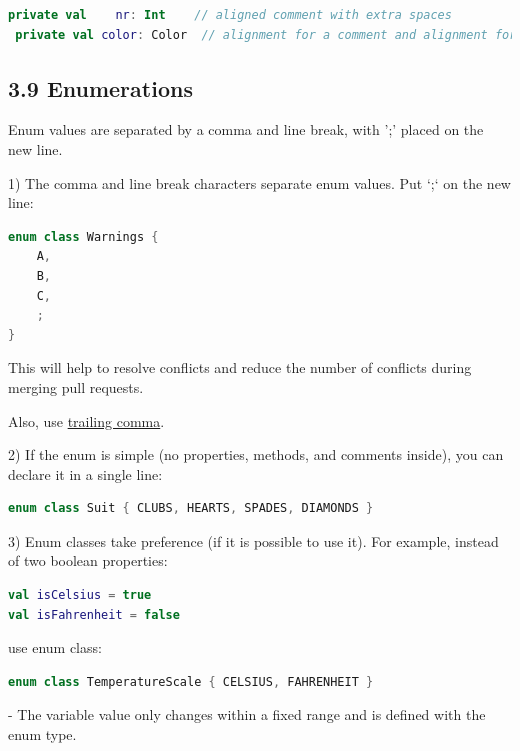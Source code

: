 {{{{\begin{lstlisting}[language=Kotlin]
 private val    nr: Int    // aligned comment with extra spaces
 private val color: Color  // alignment for a comment and alignment for identifier name
\end{lstlisting}


\subsection*{\textbf{3.9 Enumerations}}

Enum values are separated by a comma and line break, with ';' placed on the new line.



1) The comma and line break characters separate enum values. Put `;` on the new line:

\begin{lstlisting}[language=Kotlin]
enum class Warnings {
    A,
    B,
    C,
    ;
}
\end{lstlisting}


This will help to resolve conflicts and reduce the number of conflicts during merging pull requests.

Also, use \href{https://kotlinlang.org/docs/reference/whatsnew14.html#trailing-comma}{trailing comma}.



2) If the enum is simple (no properties, methods, and comments inside), you can declare it in a single line:

\begin{lstlisting}[language=Kotlin]
enum class Suit { CLUBS, HEARTS, SPADES, DIAMONDS }
\end{lstlisting}


3) Enum classes take preference (if it is possible to use it). For example, instead of two boolean properties:



\begin{lstlisting}[language=Kotlin]
val isCelsius = true
val isFahrenheit = false
\end{lstlisting}


use enum class:



\begin{lstlisting}[language=Kotlin]
enum class TemperatureScale { CELSIUS, FAHRENHEIT }
\end{lstlisting}


- The variable value only changes within a fixed range and is defined with the enum type. 

}}}}
